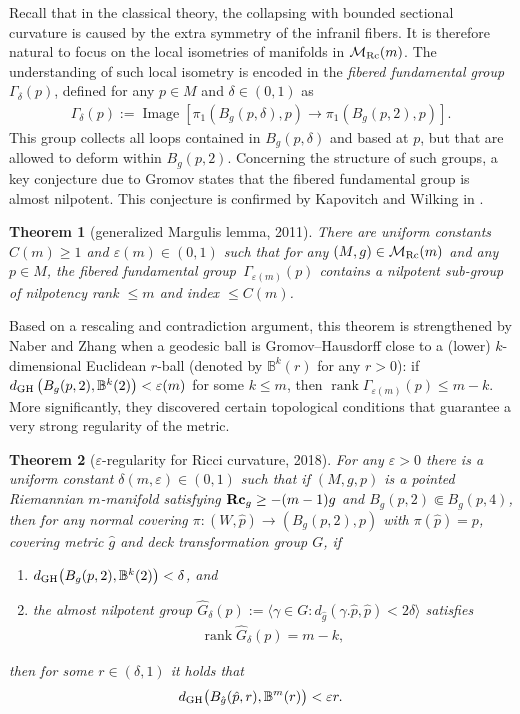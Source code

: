 \documentclass[10pt,a4paper]{amsart}
\numberwithin{equation}{section}
\newtheorem{Theorem}{Theorem}[section]
\newcommand{\Rc}{\operatorname{\bf Rc}}
\newcommand{\rank}{\operatorname{rank}}
\begin{document}
Recall that in the classical theory, the collapsing with bounded sectional
curvature is caused by the extra symmetry of the infranil fibers. It is
therefore natural to focus on the local isometries of manifolds in
$\mathcal{M}_{\rm Rc}(m)$. The understanding of such
local isometry is encoded in the \emph{fibered fundamental group}
$\Gamma_{\delta}(p)$, defined for any $p\in M$ and $\delta\in (0,1)$ as
\begin{align*}
\Gamma_{\delta}(p) := \operatorname{Image} [\pi_1(B_g(p,\delta),p)\to \pi_1(B_g(p,2),p) ].
\end{align*}
This group collects all loops contained in
$B_g(p,\delta)$ and based at $p$, but that are allowed to deform within
$B_g(p,2)$. Concerning the structure of such groups, a key conjecture due to
Gromov states that the fibered fundamental group is almost nilpotent. This
conjecture is confirmed by Kapovitch and Wilking in \cite{KW11}.
\begin{Theorem}[generalized Margulis lemma, 2011]\label{thm: KW11}
There are uniform constants $C(m)\ge 1$ and $\varepsilon(m)\in (0,1)$ such that
for any $(M,g)\in \mathcal{M}_{\rm Rc}(m)$ and any $p\in M$, the fibered
fundamental group~$\Gamma_{\varepsilon(m)}(p)$ contains a nilpotent sub-group
of nilpotency rank $\le m$ and index $\le C(m)$.
\end{Theorem}
Based on a rescaling and contradiction argument, this theorem is strengthened by
Naber and Zhang \cite{NaberZhang} when a geodesic ball is Gromov--Hausdorff close
to a (lower) $k$-dimensional Euclidean $r$-ball (denoted by $\mathbb{B}^k(r)$
for any $r>0$): if $d_{\rm GH}\left(B_g(p,2), \mathbb{B}^k(2)\right)
<\varepsilon(m)$ for some $k\le m$, then $\rank \Gamma_{\varepsilon(m)}(p)\le
m-k$. More significantly, they discovered certain topological conditions that
guarantee a very strong regularity of the metric.
\begin{Theorem}[$\varepsilon$-regularity for Ricci curvature, 2018] \label{thm: NZ18}
For any $\varepsilon>0$ there is a uniform constant $\delta(m,\varepsilon)\in
(0,1)$ such that if $(M,g,p)$ is a pointed Riemannian $m$-manifold satisfying
$\Rc_g\ge -(m-1)g$ and $B_g(p,2)\Subset B_g(p,4)$, then for any normal
covering $\pi\colon (W,\hat{p})\to (B_g(p,2),p)$ with $\pi(\hat{p})=p$, covering
metric $\hat{g}$ and deck transformation group $G$, if
\begin{enumerate}\itemsep=0pt
 \item[$1)$] $d_{\rm GH}\big(B_g(p,2),\mathbb{B}^k(2)\big)<\delta$, and
 \item[$2)$] the almost nilpotent group $\widehat{G}_{\delta}(p):= \langle
 \gamma\in G\colon d_{\hat{g}}(\gamma.\hat{p},\hat{p})<2\delta \rangle$
 satisfies \begin{align*}\rank \widehat{G}_{\delta}(p) = m-k,\end{align*}
\end{enumerate}
 then for some $r\in (\delta,1)$ it holds that
\begin{align*}
d_{\rm GH}\big(B_{\hat{g}}(\hat{p},r), \mathbb{B}^m(r)\big) < \varepsilon r.
\end{align*}
 \end{Theorem}
\end{document}

